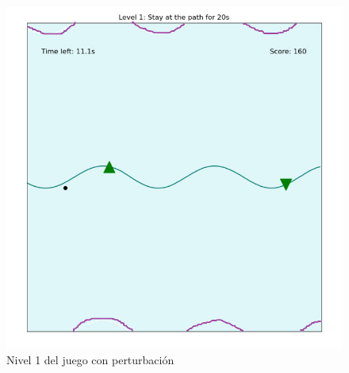 \begin{figure}[ht!]
	\centering
	\begin{minipage}{0.71\linewidth}
		\centering
		\includegraphics[width=\linewidth]{figs/flappy_level1.png}
	\end{minipage}
	\caption[Nivel 1 del juego con perturbación]{Nivel 1 del juego con perturbación}
	\label{fig:level1}
\end{figure}

